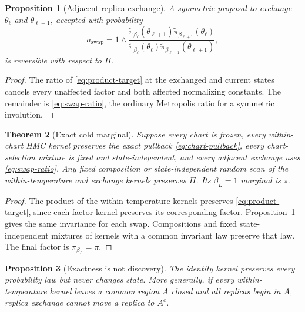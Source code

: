 \documentclass[11pt]{article}
\newtheorem{theorem}{Theorem}
\newtheorem{proposition}[theorem]{Proposition}
\theoremstyle{definition}
\theoremstyle{remark}
\newcommand{\1}{\mathbf{1}}
\begin{document}
\begin{proposition}[Adjacent replica exchange]
\label{prop:replica-swap}
A symmetric proposal to exchange $\theta_\ell$ and $\theta_{\ell+1}$, accepted
with probability
\begin{equation}
 a_{\mathrm{swap}}
 =1\wedge
 \frac{
  \widetilde\pi_{\beta_\ell}(\theta_{\ell+1})
  \widetilde\pi_{\beta_{\ell+1}}(\theta_\ell)}{
  \widetilde\pi_{\beta_\ell}(\theta_\ell)
  \widetilde\pi_{\beta_{\ell+1}}(\theta_{\ell+1})},
 \label{eq:swap-ratio}
\end{equation}
is reversible with respect to $\Pi$.
\end{proposition}

\begin{proof}
The ratio of \eqref{eq:product-target} at the exchanged and current states
cancels every unaffected factor and both affected normalizing constants.  The
remainder is \eqref{eq:swap-ratio}, the ordinary Metropolis ratio for a
symmetric involution.
\end{proof}

\begin{theorem}[Exact cold marginal]
\label{thm:exact-cold-marginal}
Suppose every chart is frozen, every within-chart HMC kernel preserves the
exact pullback \eqref{eq:chart-pullback}, every chart-selection mixture is fixed
and state-independent, and every adjacent exchange uses
\eqref{eq:swap-ratio}.  Any fixed composition or state-independent random scan
of the within-temperature and exchange kernels preserves $\Pi$.  Its
$\beta_L=1$ marginal is $\pi$.
\end{theorem}

\begin{proof}
The product of the within-temperature kernels preserves
\eqref{eq:product-target}, since each factor kernel preserves its corresponding
factor.  Proposition~\ref{prop:replica-swap} gives the same invariance for each
swap.  Compositions and fixed state-independent mixtures of kernels with a
common invariant law preserve that law.  The final factor is
$\pi_{\beta_L}=\pi$.
\end{proof}

\begin{proposition}[Exactness is not discovery]
\label{prop:exact-not-discovery}
The identity kernel preserves every probability law but never changes state.
More generally, if every within-temperature kernel leaves a common region $A$
closed and all replicas begin in $A$, replica exchange cannot move a replica to
$A^c$.
\end{proposition}
\end{document}
